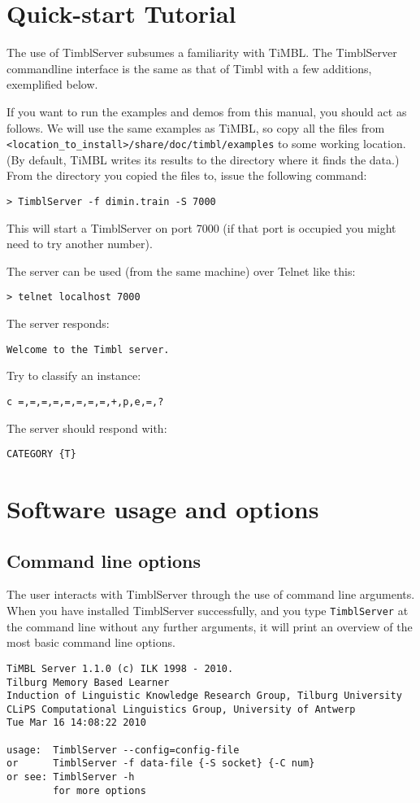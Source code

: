 \documentclass{report}
\begin{document}
\chapter{Quick-start Tutorial}
\label{tutorial}

The use of TimblServer subsumes a familiarity with TiMBL.  The
TimblServer commandline interface is the same as that of Timbl with a
few additions, exemplified below.

If you want to run the examples and demos from this manual, you should
act as follows. We will use the same examples as TiMBL, so copy all the files from {\tt
 <location\_to\_install>/share/doc/timbl/examples} to some working
location. (By default, TiMBL writes its results to the directory where
it finds the data.) From the directory you copied the files to, issue
the following command:

{\tt > TimblServer -f dimin.train -S 7000}

This will start a TimblServer on port 7000 (if that port is occupied you might need to try another number).

The server can be used (from the same machine) over Telnet like this:

{\tt > telnet localhost 7000 }

The server responds:

{\tt Welcome to the Timbl server.}

Try to classify an instance:

{\tt c =,=,=,=,=,=,=,=,+,p,e,=,? }

The server should respond with:

{\tt CATEGORY \{T\} }


\chapter{Software usage and options}
\label{reference}

\section{Command line options}
\label{commandline}

The user interacts with TimblServer through the use of command line
arguments.  When you have installed TimblServer successfully, and you
type {\tt TimblServer} at the command line without any further
arguments, it will print an overview of the most basic command line
options.

{\footnotesize
\begin{verbatim}
TiMBL Server 1.1.0 (c) ILK 1998 - 2010.
Tilburg Memory Based Learner
Induction of Linguistic Knowledge Research Group, Tilburg University
CLiPS Computational Linguistics Group, University of Antwerp
Tue Mar 16 14:08:22 2010

usage:  TimblServer --config=config-file
or      TimblServer -f data-file {-S socket} {-C num}
or see: TimblServer -h
        for more options
\end{verbatim}
}
\end{document}
